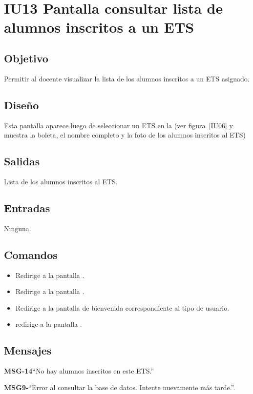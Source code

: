 \section{IU13 Pantalla consultar lista de alumnos inscritos a un ETS}

\subsection{Objetivo}
Permitir al docente visualizar la lista de los alumnos inscritos a un ETS asignado.

\subsection{Diseño}
Esta pantalla aparece luego de seleccionar un ETS en la  (ver figura~\ref{IU06} y muestra la boleta, el nombre completo y la foto de los alumnos inscritos al ETS)


\subsection{Salidas}
Lista de los alumnos inscritos al ETS.

\subsection{Entradas}
Ninguna

\subsection{Comandos}
\begin{itemize}
    \item {} Redirige a la pantalla .
    \item {} Redirige a la pantalla .
    \item {} Redirige a la pantalla de bienvenida correspondiente al tipo de usuario.
	\item {} redirige a la pantalla .
\end{itemize}

\subsection{Mensajes}

\begin{Citemize}
	\item {\bf MSG-14}{``No hay alumnos inscritos en este ETS.''}
	\item {\bf MSG9-}{``Error al consultar la base de datos. Intente nuevamente más tarde.''}. 
\end{Citemize}